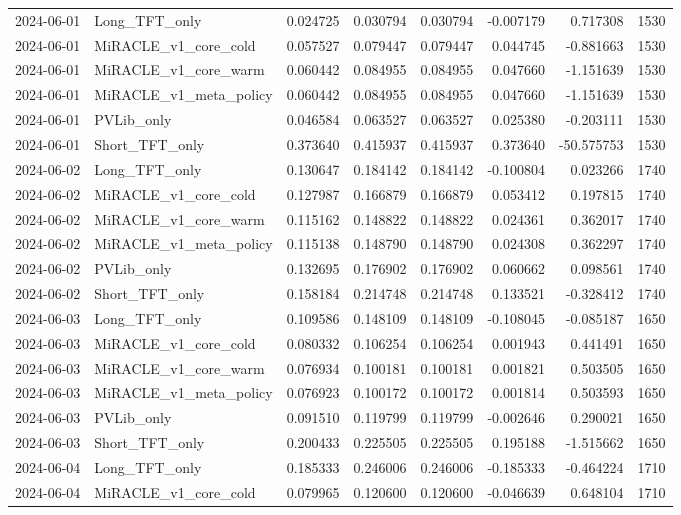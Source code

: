 \begin{tabular}{llrrrrrr}
2024-06-01 & Long_TFT_only & 0.024725 & 0.030794 & 0.030794 & -0.007179 & 0.717308 & 1530 \\
2024-06-01 & MiRACLE_v1_core_cold & 0.057527 & 0.079447 & 0.079447 & 0.044745 & -0.881663 & 1530 \\
2024-06-01 & MiRACLE_v1_core_warm & 0.060442 & 0.084955 & 0.084955 & 0.047660 & -1.151639 & 1530 \\
2024-06-01 & MiRACLE_v1_meta_policy & 0.060442 & 0.084955 & 0.084955 & 0.047660 & -1.151639 & 1530 \\
2024-06-01 & PVLib_only & 0.046584 & 0.063527 & 0.063527 & 0.025380 & -0.203111 & 1530 \\
2024-06-01 & Short_TFT_only & 0.373640 & 0.415937 & 0.415937 & 0.373640 & -50.575753 & 1530 \\
2024-06-02 & Long_TFT_only & 0.130647 & 0.184142 & 0.184142 & -0.100804 & 0.023266 & 1740 \\
2024-06-02 & MiRACLE_v1_core_cold & 0.127987 & 0.166879 & 0.166879 & 0.053412 & 0.197815 & 1740 \\
2024-06-02 & MiRACLE_v1_core_warm & 0.115162 & 0.148822 & 0.148822 & 0.024361 & 0.362017 & 1740 \\
2024-06-02 & MiRACLE_v1_meta_policy & 0.115138 & 0.148790 & 0.148790 & 0.024308 & 0.362297 & 1740 \\
2024-06-02 & PVLib_only & 0.132695 & 0.176902 & 0.176902 & 0.060662 & 0.098561 & 1740 \\
2024-06-02 & Short_TFT_only & 0.158184 & 0.214748 & 0.214748 & 0.133521 & -0.328412 & 1740 \\
2024-06-03 & Long_TFT_only & 0.109586 & 0.148109 & 0.148109 & -0.108045 & -0.085187 & 1650 \\
2024-06-03 & MiRACLE_v1_core_cold & 0.080332 & 0.106254 & 0.106254 & 0.001943 & 0.441491 & 1650 \\
2024-06-03 & MiRACLE_v1_core_warm & 0.076934 & 0.100181 & 0.100181 & 0.001821 & 0.503505 & 1650 \\
2024-06-03 & MiRACLE_v1_meta_policy & 0.076923 & 0.100172 & 0.100172 & 0.001814 & 0.503593 & 1650 \\
2024-06-03 & PVLib_only & 0.091510 & 0.119799 & 0.119799 & -0.002646 & 0.290021 & 1650 \\
2024-06-03 & Short_TFT_only & 0.200433 & 0.225505 & 0.225505 & 0.195188 & -1.515662 & 1650 \\
2024-06-04 & Long_TFT_only & 0.185333 & 0.246006 & 0.246006 & -0.185333 & -0.464224 & 1710 \\
2024-06-04 & MiRACLE_v1_core_cold & 0.079965 & 0.120600 & 0.120600 & -0.046639 & 0.648104 & 1710 \\

\end{tabular}
